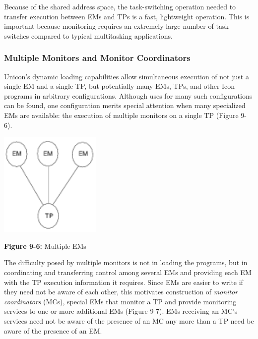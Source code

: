 Because of the shared address space, the task-switching operation
needed to transfer execution between EMs and TPs is a fast,
lightweight operation.  This is important because monitoring
requires an extremely large number of task switches compared to
typical multitasking applications.


\subsubsection{Multiple Monitors and Monitor Coordinators}

Unicon's dynamic loading capabilities allow simultaneous execution of
not just a single EM and a single TP, but potentially many EMs, TPs,
and other Icon programs in arbitrary configurations.  Although uses
for many such configurations can be found, one configuration merits
special attention when many specialized EMs are available: the
execution of multiple monitors on a single TP 
(Figure 9-6).

\begin{center}
\includegraphics[height=2.0in]{multiems.png}
\end{center}

{\sffamily\bfseries Figure 9-6:}
{\sffamily Multiple EMs}

\bigskip

The difficulty posed by multiple monitors is not in loading the
programs, but in coordinating and transferring control among several
EMs and providing each EM with the TP execution information it
requires.  Since EMs are easier to write if they need not be aware of
each other, this motivates construction of {\em monitor coordinators\/}
(MCs), special EMs that monitor a TP and provide monitoring services
to one or more additional EMs (Figure 9-7).  EMs receiving an MC's
services need not be aware of the presence of an MC any more than a TP
need be aware of the presence of an EM.

